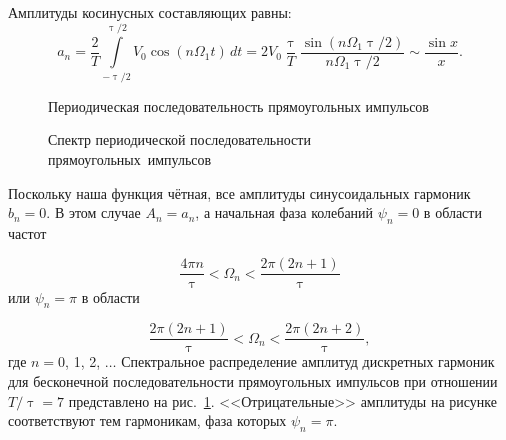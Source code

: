 Амплитуды косинусных составляющих равны:
\begin{equation}
	a_n = \frac{2}{T} \int\limits_{-\uptau/2}^{\uptau/2} \!V_0\cos(n\Omega_1t)\,dt = 2V_0 \frac{\uptau}{T} \frac{\sin(n\Omega_1\uptau/2)}{n\Omega_1\uptau/2} \sim \frac{\sin x}{x}.
	\label{eq:621}
\end{equation}


\begin{figure}[t]
\begin{minipage}{0.45\textwidth}
	\caption{Периодическая последовательность прямоугольных импульсов}
	\label{fig:621}
\end{minipage}
\hfill
\begin{minipage}{0.45\textwidth}
	\caption{Спектр периодической последовательности прямоугольных~импульсов}
	\label{fig:622}
\end{minipage}
\end{figure}

Поскольку наша функция чётная, все амплитуды синусоидальных гармоник $b_n=0$. В этом случае $A_n=a_n$, а начальная фаза
колебаний $\psi_n=0$ в области частот

\begin{equation}
	\frac{4\pi n}{\uptau}<\Omega_n<\frac{2\pi (2n+1)}{\uptau}
	\label{eq:622}
\end{equation}
или $\psi_n=\pi$ в области

\begin{equation}
	\frac{2\pi(2n+1)}{\uptau} < \Omega_n < \frac{2\pi (2n+2)}{\uptau},
	\label{eq:622'}
\end{equation}
где $n=0$, 1, 2, $\dots$ Спектральное распределение амплитуд дискретных гармоник для бесконечной последовательности прямоугольных импульсов при отношении $T/\uptau=7$ представлено на рис.~\ref{fig:622}.
<<Отрицательные>> амплитуды на рисунке соответствуют тем гармоникам, фаза которых $\psi_n=\pi$.

